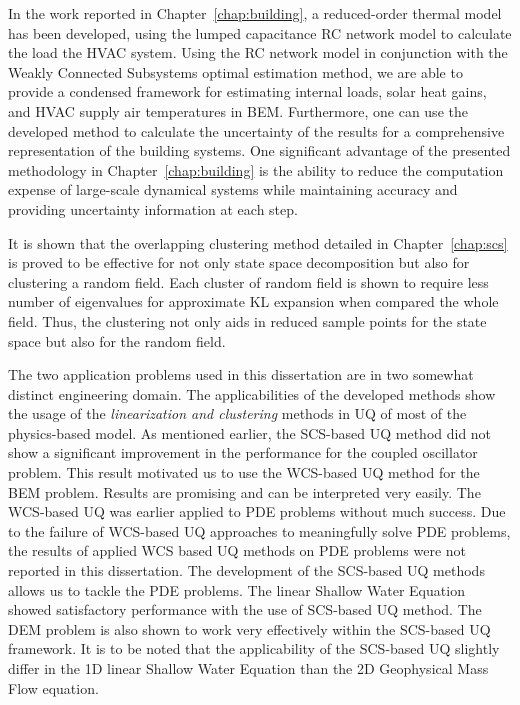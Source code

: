 In the work reported in Chapter~\ref{chap:building}, a reduced-order thermal model has been developed, using the lumped capacitance RC network model to calculate the load the HVAC system. Using the RC network model in conjunction with the Weakly Connected Subsystems optimal estimation method, we are able to provide a condensed framework for estimating internal loads, solar heat gains, and HVAC supply air temperatures in BEM.  Furthermore, one can use the developed method to calculate the uncertainty of the results for a comprehensive representation of the building systems.
One significant advantage of the presented methodology in Chapter~\ref{chap:building} is the ability to reduce the computation expense of large-scale dynamical systems while maintaining accuracy and providing uncertainty information at each step.  

It is shown that the overlapping clustering method detailed in Chapter~\ref{chap:scs} is proved to be effective for not only state space decomposition but also for clustering a random field. Each cluster of random field is shown to require less number of eigenvalues for approximate KL expansion when compared the whole field. Thus, the clustering not only aids in reduced sample points for the state space but also for the random field.


The two application problems used in this dissertation are in two somewhat distinct engineering domain. The applicabilities of the developed methods show the usage of the \textit{linearization and clustering} methods in UQ of most of the physics-based model. As mentioned earlier, the SCS-based UQ method did not show a significant improvement in the performance for the coupled oscillator problem. This result motivated us to use the WCS-based UQ method for the BEM problem. Results are promising and can be interpreted very easily. The WCS-based UQ was earlier applied to PDE problems without much success. Due to the failure of WCS-based UQ approaches to meaningfully solve PDE problems, the results of applied WCS based UQ methods on PDE problems were not reported in this dissertation. The development of the SCS-based UQ methods allows us to tackle the PDE problems. The linear Shallow Water Equation showed satisfactory performance with the use of SCS-based UQ method. The DEM problem is also shown to work very effectively within the SCS-based UQ framework. It is to be noted that the applicability of the SCS-based UQ slightly differ in the 1D linear Shallow Water Equation than the 2D Geophysical Mass Flow equation. 

